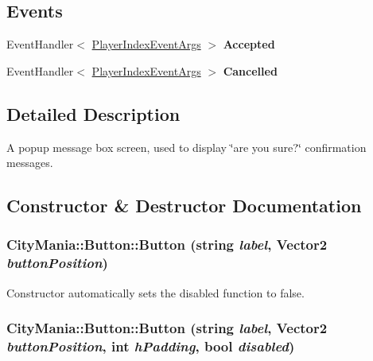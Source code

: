 \subsection*{Events}
\begin{DoxyCompactItemize}
\item 
\hypertarget{classCityMania_1_1Button_a441df6a5f1bc349c3a41149bd3e42e7b}{
EventHandler$<$ \hyperlink{classCityMania_1_1PlayerIndexEventArgs}{PlayerIndexEventArgs} $>$ {\bfseries Accepted}}
\label{classCityMania_1_1Button_a441df6a5f1bc349c3a41149bd3e42e7b}

\item 
\hypertarget{classCityMania_1_1Button_ab9f75f34fdfb91c3d03aa95a7741e0ad}{
EventHandler$<$ \hyperlink{classCityMania_1_1PlayerIndexEventArgs}{PlayerIndexEventArgs} $>$ {\bfseries Cancelled}}
\label{classCityMania_1_1Button_ab9f75f34fdfb91c3d03aa95a7741e0ad}

\end{DoxyCompactItemize}


\subsection{Detailed Description}
A popup message box screen, used to display \char`\"{}are you sure?\char`\"{} confirmation messages. 

\subsection{Constructor \& Destructor Documentation}
\hypertarget{classCityMania_1_1Button_a7f87e6ba947642e4eb464f2175e425ad}{
\subsubsection[{Button}]{\setlength{\rightskip}{0pt plus 5cm}CityMania::Button::Button (string {\em label}, \/  Vector2 {\em buttonPosition})}}
\label{classCityMania_1_1Button_a7f87e6ba947642e4eb464f2175e425ad}


Constructor automatically sets the disabled function to false. \hypertarget{classCityMania_1_1Button_a9e15249818478f7500f4620ac81149e9}{
\subsubsection[{Button}]{\setlength{\rightskip}{0pt plus 5cm}CityMania::Button::Button (string {\em label}, \/  Vector2 {\em buttonPosition}, \/  int {\em hPadding}, \/  bool {\em disabled})}}
\label{classCityMania_1_1Button_a9e15249818478f7500f4620ac81149e9}


